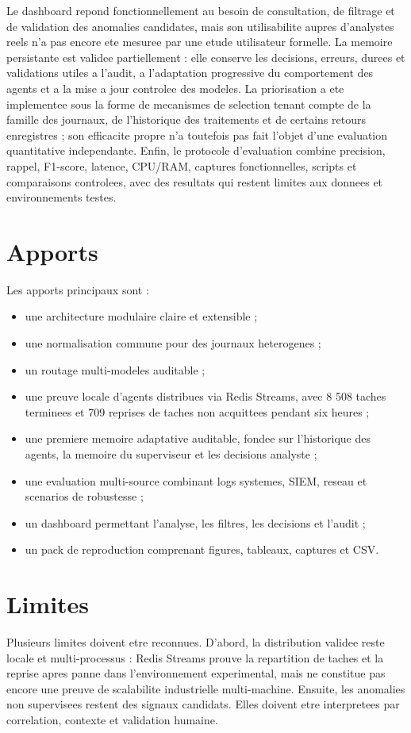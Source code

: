 Le dashboard repond fonctionnellement au besoin de consultation, de filtrage et de validation des anomalies candidates, mais son utilisabilite aupres d'analystes reels n'a pas encore ete mesuree par une etude utilisateur formelle. La memoire persistante est validee partiellement : elle conserve les decisions, erreurs, durees et validations utiles a l'audit, a l'adaptation progressive du comportement des agents et a la mise a jour controlee des modeles. La priorisation a ete implementee sous la forme de mecanismes de selection tenant compte de la famille des journaux, de l'historique des traitements et de certains retours enregistres ; son efficacite propre n'a toutefois pas fait l'objet d'une evaluation quantitative independante. Enfin, le protocole d'evaluation combine precision, rappel, F1-score, latence, CPU/RAM, captures fonctionnelles, scripts et comparaisons controlees, avec des resultats qui restent limites aux donnees et environnements testes.

\section{Apports}
Les apports principaux sont :
\begin{itemize}
  \item une architecture modulaire claire et extensible ;
  \item une normalisation commune pour des journaux heterogenes ;
  \item un routage multi-modeles auditable ;
  \item une preuve locale d'agents distribues via Redis Streams, avec 8 508 taches terminees et 709 reprises de taches non acquittees pendant six heures ;
  \item une premiere memoire adaptative auditable, fondee sur l'historique des agents, la memoire du superviseur et les decisions analyste ;
  \item une evaluation multi-source combinant logs systemes, SIEM, reseau et scenarios de robustesse ;
  \item un dashboard permettant l'analyse, les filtres, les decisions et l'audit ;
  \item un pack de reproduction comprenant figures, tableaux, captures et CSV.
\end{itemize}

\section{Limites}
Plusieurs limites doivent etre reconnues. D'abord, la distribution validee reste locale et multi-processus : Redis Streams prouve la repartition de taches et la reprise apres panne dans l'environnement experimental, mais ne constitue pas encore une preuve de scalabilite industrielle multi-machine. Ensuite, les anomalies non supervisees restent des signaux candidats. Elles doivent etre interpretees par correlation, contexte et validation humaine.

